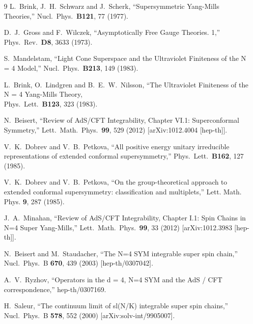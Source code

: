 \documentclass[a4paper,11pt]{article}
\numberwithin{equation}{section}
\begin{document}
\begin{thebibliography} {9}
 L.~Brink, J.~H.~Schwarz and J.~Scherk, 
 ``Supersymmetric Yang-Mills Theories,''
  Nucl.\ Phys.\ {\bf B121}, 77 (1977).

	D.~J.~Gross and F.~Wilczek, 
	``Asymptotically Free Gauge Theories. 1,''
	Phys.\ Rev.\ {\bf D8}, 3633 (1973).

	S.~Mandelstam,
	``Light Cone Superspace and the Ultraviolet Finiteness of the N = 4 Model,''
	Nucl.\ Phys.\ {\bf B213}, 149 (1983).

	L.~Brink, O.~Lindgren and B.~E.~W.~Nilsson,
	``The Ultraviolet Finiteness of the N = 4 Yang-Mills Theory,\\
	Phys.\ Lett.\ {\bf B123}, 323 (1983).

  N.~Beisert,
  ``Review of AdS/CFT Integrability, Chapter VI.1: Superconformal Symmetry,''
  Lett.\ Math.\ Phys.\  {\bf 99}, 529 (2012)
  [arXiv:1012.4004 [hep-th]].

	V.~K.~Dobrev and V.~B.~Petkova, 
	``All positive energy unitary irreducible representations of extended conformal supersymmetry,''
	Phys.\ Lett.\ {\bf B162}, 127 (1985).

	V.~K.~Dobrev and V.~B.~Petkova,
	``On the group-theoretical approach to extended conformal supersymmetry: classification and multiplets,''
	Lett. Math. Phys. {\bf 9}, 287 (1985).

  J.~A.~Minahan,
  ``Review of AdS/CFT Integrability, Chapter I.1: Spin Chains in N=4 Super Yang-Mills,''
  Lett.\ Math.\ Phys.\  {\bf 99}, 33 (2012)
  [arXiv:1012.3983 [hep-th]].

  N.~Beisert and M.~Staudacher,
  ``The N=4 SYM integrable super spin chain,''
  Nucl.\ Phys.\ B {\bf 670}, 439 (2003)
  [hep-th/0307042].

  A.~V.~Ryzhov,
  ``Operators in the d = 4, N=4 SYM and the AdS / CFT correspondence,''
  hep-th/0307169.

	H.~Saleur, 
	``The continuum limit of sl(N/K) integrable super spin chains,'' 
	Nucl.\ Phys.\ B {\bf 578}, 552 (2000) 
	[arXiv:solv-int/9905007].


\end{thebibliography}
\end{document}

